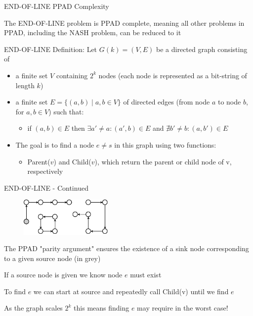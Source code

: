 \begin{frame}{END-OF-LINE PPAD Complexity}

    The END-OF-LINE problem is PPAD complete, meaning all other problems in PPAD, including the NASH problem, can be reduced to it

	\begin{bluebox}
        END-OF-LINE Definition: Let \( G(k) = (V, E) \) be a directed graph consisting of
        \begin{itemize}
        \item a finite set \( V \) containing \( 2^k \) nodes (each node is represented as a bit-string of length \( k \))
        \item a finite set \( E = \{ (a, b) \mid a, b \in V \} \) of directed edges (from node \( a \) to node \( b \), for \( a, b \in V \)) such that:
        \begin{itemize}
        \item if \( (a, b) \in E \) then \( \exists a' \neq a: (a', b) \in E \) and \( \nexists b' \neq b: (a, b') \in E \)
        \end{itemize}
        \item The goal is to find a node \(e \neq s\) in this graph using two functions:
            \begin{itemize}
                \item Parent(\(v\)) and Child(\(v\)), which return the parent or child node of v, respectively
            \end{itemize}
        \end{itemize}
  	\end{bluebox}
  	
\end{frame}

\begin{frame}{END-OF-LINE - Continued}

\begin{figure}
    \centering
    \includegraphics[width=0.4\textwidth, height=0.4\textheight, keepaspectratio]{images/chapter_4/PPAD.pdf}
\end{figure}

\blist
    \item The PPAD "parity argument" ensures the existence of a sink node corresponding to a given source node (in grey)
    \item If a source node is given we know node \(e\) must exist
    \item To find \(e\) we can start at source and repeatedly call Child(v) until we find \(e\)
    \item As the graph scales \(2^k\) this means finding \(e\) may require  in the worst case!
\elist
    
\end{frame}

